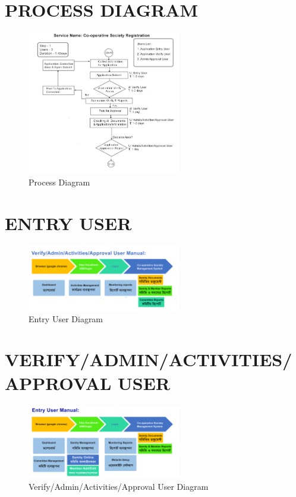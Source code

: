 \section{PROCESS DIAGRAM}
\begin{figure}[h]
  \centering
  \includegraphics[width=0.6\textwidth]{Chap3/3.png}
  \caption{Process Diagram}
  \label{fig:example}
\end{figure}

\section{ENTRY USER}
\begin{figure}[h]
  \centering
  \includegraphics[width=0.6\textwidth]{Chap3/4.png}
  \caption{Entry User Diagram}
  \label{fig:example}
\end{figure}

\section{VERIFY/ADMIN/ACTIVITIES/APPROVAL USER }
\begin{figure}[h]
  \centering
  \includegraphics[width=0.6\textwidth]{Chap3/5.png}
  \caption{Verify/Admin/Activities/Approval User Diagram}
  \label{fig:example}
\end{figure}

